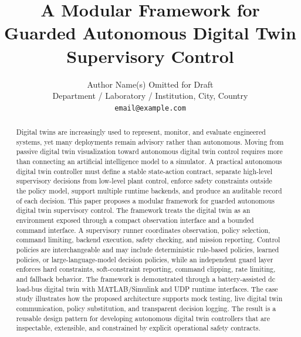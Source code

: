 \documentclass[conference]{IEEEtran}
\begin{document}
\title{A Modular Framework for Guarded Autonomous Digital Twin Supervisory Control}

\ifieeetran
\author{
}
\else
\author{Author Name(s) Omitted for Draft\\
Department / Laboratory / Institution, City, Country\\
\texttt{email@example.com}}
\date{}
\fi

\maketitle

\begin{abstract}
Digital twins are increasingly used to represent, monitor, and evaluate
engineered systems, yet many deployments remain advisory rather than
autonomous. Moving from passive digital twin visualization toward autonomous
digital twin control requires more than connecting an artificial intelligence
model to a simulator. A practical autonomous digital twin controller must
define a stable state-action contract, separate high-level supervisory
decisions from low-level plant control, enforce safety constraints outside the
policy model, support multiple runtime backends, and produce an auditable
record of each decision. This paper proposes a modular framework for guarded
autonomous digital twin supervisory control. The framework treats the digital
twin as an environment exposed through a compact observation interface and a
bounded command interface. A supervisory runner coordinates observation,
policy selection, command limiting, backend execution, safety checking, and
mission reporting. Control policies are interchangeable and may include
deterministic rule-based policies, learned policies, or large-language-model
decision policies, while an independent guard layer enforces hard constraints,
soft-constraint reporting, command clipping, rate limiting, and fallback
behavior. The framework is demonstrated through a battery-assisted dc load-bus
digital twin with MATLAB/Simulink and UDP runtime interfaces. The case study
illustrates how the proposed architecture supports mock testing, live digital
twin communication, policy substitution, and transparent decision logging. The
result is a reusable design pattern for developing autonomous digital twin
controllers that are inspectable, extensible, and constrained by explicit
operational safety contracts.
\end{abstract}
\end{document}
